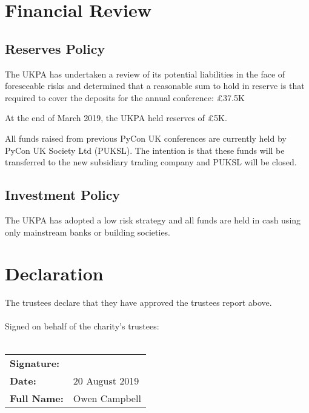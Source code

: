 \documentclass[11pt, final]{article}
\begin{document}
    \section{Financial Review}

        \subsection{Reserves Policy}
        The UKPA has undertaken a review of its potential liabilities in the face of foreseeable risks and determined that a reasonable sum to hold in reserve is that required to cover the deposits for the annual conference: \pounds37.5K

        At the end of March 2019, the UKPA held reserves of \pounds5K.
        
        All funds raised from previous PyCon UK conferences are currently held by PyCon UK Society Ltd (PUKSL). The intention is that these funds will be transferred to the new subsidiary trading company  and PUKSL will be closed.
        
        \subsection{Investment Policy}
        The UKPA has adopted a low risk strategy and all funds are held in cash using only mainstream banks or building societies.

    \section{Declaration}
    The trustees declare that they have approved the trustees report above.\\
    \\
    Signed on behalf of the charity's trustees:\\
    \\
    \begin{tabular}{l l}
        \textbf{Signature:}\vspace{2cm}\\
        \textbf{Date:} & 20 August 2019\vspace{1cm}\\   
        \textbf{Full Name:} & Owen Campbell \\
    \end{tabular}
\end{document}
